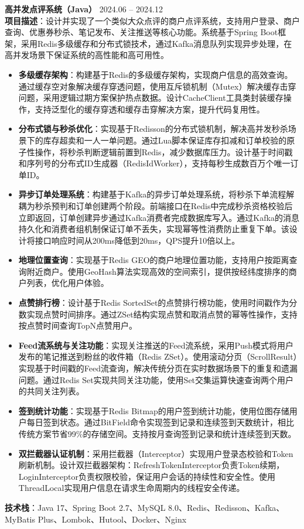 \noindent
\textbf{高并发点评系统（Java）} \hfill 2024.06 – 2024.12 \\
\textbf{项目描述}：设计并实现了一个类似大众点评的商户点评系统，支持用户登录、商户查询、优惠券秒杀、笔记发布、关注推送等核心功能。系统基于Spring Boot框架，采用Redis多级缓存和分布式锁技术，通过Kafka消息队列实现异步处理，在高并发场景下保证系统的高性能和高可用性。
\begin{itemize}
    \item \textbf{多级缓存架构}：构建基于Redis的多级缓存架构，实现商户信息的高效查询。通过缓存空对象解决缓存穿透问题，使用互斥锁机制（Mutex）解决缓存击穿问题，采用逻辑过期方案保护热点数据。设计CacheClient工具类封装缓存操作，支持泛型化的缓存穿透和缓存击穿解决方案，提升代码复用性。
    \item \textbf{分布式锁与秒杀优化}：实现基于Redisson的分布式锁机制，解决高并发秒杀场景下的库存超卖和一人一单问题。通过Lua脚本保证库存扣减和订单校验的原子性操作，将秒杀判断逻辑前置到Redis，减少数据库压力。设计基于时间戳和序列号的分布式ID生成器（RedisIdWorker），支持每秒生成数百万个唯一订单ID。
    \item \textbf{异步订单处理系统}：构建基于Kafka的异步订单处理系统，将秒杀下单流程解耦为秒杀预判和订单创建两个阶段。前端接口在Redis中完成秒杀资格校验后立即返回，订单创建异步通过Kafka消费者完成数据库写入。通过Kafka的消息持久化和消费者组机制保证订单不丢失，实现幂等性消费防止重复下单。该设计将接口响应时间从200ms降低到20ms，QPS提升10倍以上。
    \item \textbf{地理位置查询}：实现基于Redis GEO的商户地理位置功能，支持用户按距离查询附近商户。使用GeoHash算法实现高效的空间索引，提供按经纬度排序的商户列表，优化用户体验。
    \item \textbf{点赞排行榜}：设计基于Redis SortedSet的点赞排行榜功能，使用时间戳作为分数实现点赞时间排序。通过ZSet结构实现点赞和取消点赞的幂等性操作，支持按点赞时间查询TopN点赞用户。
    \item \textbf{Feed流系统与关注功能}：实现关注推送的Feed流系统，采用Push模式将用户发布的笔记推送到粉丝的收件箱（Redis ZSet）。使用滚动分页（ScrollResult）实现基于时间戳的Feed流查询，解决传统分页在实时数据场景下的重复和遗漏问题。通过Redis Set实现共同关注功能，使用Set交集运算快速查询两个用户的共同关注列表。
    \item \textbf{签到统计功能}：实现基于Redis Bitmap的用户签到统计功能，使用位图存储用户每日签到状态。通过BitField命令实现签到记录和连续签到天数统计，相比传统方案节省99\%的存储空间。支持按月查询签到记录和统计连续签到天数。
    \item \textbf{双拦截器认证机制}：采用拦截器（Interceptor）实现用户登录态校验和Token刷新机制。设计双拦截器架构：RefreshTokenInterceptor负责Token续期，LoginInterceptor负责权限校验，保证用户会话的持续性和安全性。使用ThreadLocal实现用户信息在请求生命周期内的线程安全传递。
\end{itemize}
\textbf{技术栈}：Java 17、Spring Boot 2.7、MySQL 8.0、Redis、Redisson、Kafka、MyBatis Plus、Lombok、Hutool、Docker、Nginx
\vspace{0.2cm}
